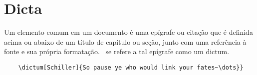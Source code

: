 \chapter{Dicta}
Um elemento comum em um documento é uma epígrafe ou citação que é definida acima ou abaixo de um título de capítulo ou seção, junto com uma referência à fonte e sua própria formatação. \KOMAScript\ se refere a tal epígrafe como um dictum.
\begin{verbatim}
    \dictum[Schiller]{So pause ye who would link your fates~\dots}}
\end{verbatim}

